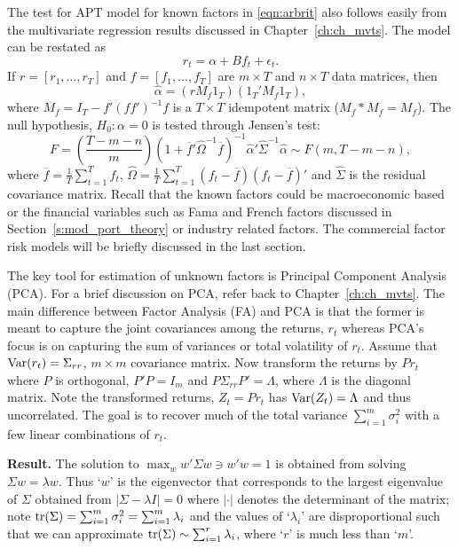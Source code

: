 The test for APT model for known factors in \eqref{eqn:arbrit} also follows easily from the multivariate regression results discussed in Chapter~\ref{ch:ch_mvts}. The model can be restated as
	\begin{equation} \label{eqn:5rtalpha}
	r_t = \alpha + B f_t + \epsilon_t.
	\end{equation}
If $r =[r_1, \ldots, r_T]$ and $f= [f_1, \ldots, f_T]$ are $m \times T$ and $n \times T$ data matrices, then
	\begin{equation}\label{eqn:5hatalpha}
	\hat{\alpha}= (r M_f 1_T)(1_T'  M_f 1_T),
	\end{equation}	
where $M_f=I_T - f'(ff')^{-1}f$ is a $T \times T$ idempotent matrix ($M_f * M_f= M_f$). The null hypothesis, $H_0: \alpha= 0$ is tested through Jensen's test:
	\begin{equation}\label{eqn:bigF}
	F= \left( \dfrac{T - m - n}{m} \right) (1 + \overline{f}' \hat{\Omega}^{-1} \overline{f})^{-1} \hat{\alpha}' \hat{\Sigma}^{-1} \hat{\alpha} \sim F(m,T - m - n),
	\end{equation}	
where $\overline{f}= \frac{1}{T} \sum_{t=1}^T f_t$, $\hat{\Omega}= \frac{1}{T} \sum_{t=1}^T (f_t - \overline{f})(f_t - \overline{f})'$ and $\hat{\Sigma}$ is the residual covariance matrix. Recall that the known factors could be macroeconomic based or the financial variables such as Fama and French factors discussed in Section~\ref{s:mod_port_theory} or industry related factors. The commercial factor risk models will be briefly discussed in the last section.


The key tool for estimation of unknown factors is Principal Component Analysis (PCA). For a brief discussion on PCA, refer back to Chapter~\ref{ch:ch_mvts}. The main difference between Factor Analysis (FA) and PCA is that the former is meant to capture the joint covariances among the returns, $r_t$ whereas PCA's focus is on capturing the sum of variances or total volatility of $r_t$. Assume that $\operatorname{Var}(r_t)= \Sigma_{rr}$, $m \times m$ covariance matrix. Now transform the returns by $Pr_t$ where $P$ is orthogonal, $P'P=I_m$ and $P\Sigma_{rr}P'= \Lambda$, where $\Lambda$ is the diagonal matrix. Note the transformed returns, $Z_t= Pr_t$ has $\operatorname{Var}(Z_t)= \Lambda$ and thus uncorrelated. The goal is to recover much of the total variance $\sum_{i=1}^m \sigma_i^2$ with a few linear combinations of $r_t$. \twomedskip


\noindent\textbf{Result. } The solution to $\max_w w' \Sigma w \ni w'w=1$ is obtained from solving $\Sigma w= \lambda w$. Thus `$w$' is the eigenvector that corresponds to the largest eigenvalue of $\Sigma$ obtained from $\lvert \Sigma - \lambda I\rvert=0$ where $|\cdot|$ denotes the determinant of the matrix; note $\operatorname{tr}(\Sigma)= \sum_{i=1}^m \sigma_i^2 = \sum_{i=1}^m \lambda_i$ and the values of `$\lambda_i$' are disproportional such that we can approximate $\operatorname{tr}(\Sigma) \sim \sum_{i=1}^r \lambda_i$, where `$r$' is much less than `$m$'. \twomedskip
	
